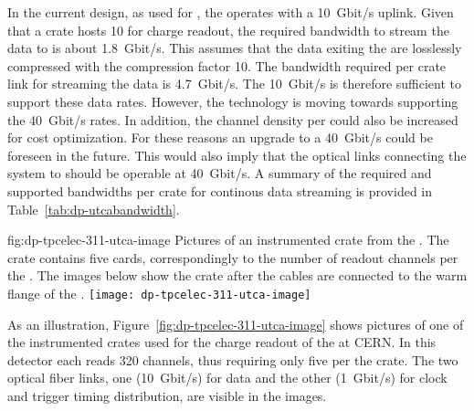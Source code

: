In the current design, as used for , the  operates with a \SI{10}{Gbit/s} uplink. Given that a  crate hosts \num{10}  for charge readout, the required bandwidth to stream the data to  is about \SI{1.8}{Gbit/s}. This assumes that the data exiting the  are losslessly compressed with the compression factor \num{10}. The bandwidth required per crate link for streaming the  data is \SI{4.7}{Gbit/s}. The \SI{10}{Gbit/s}  is therefore sufficient to support these data rates. However, the technology is moving towards supporting the \SI{40}{Gbit/s} rates. In addition, the channel density per  could also be increased for cost optimization. For these reasons an upgrade to a \SI{40}{Gbit/s}  could be foreseen in the future. This would also imply that the optical links connecting the  system to   should be operable at \SI{40}{Gbit/s}. A summary of the required and supported bandwidths per  crate for continous data streaming is provided in Table~\ref{tab:dp-utcabandwidth}.

\begin{dunefigure}{fig:dp-tpcelec-311-utca-image}
{Pictures of an instrumented  crate from the . The crate contains five  cards, correspondingly to the number of readout channels per the . The images below show the crate after the  cables are connected to the warm flange of the .}
\texttt{[image: dp-tpcelec-311-utca-image]}
\end{dunefigure}

As an illustration, Figure~\ref{fig:dp-tpcelec-311-utca-image} shows pictures of one of the instrumented  crates used for the charge readout of the  at CERN. In this detector each  reads \num{320} channels, thus requiring only five  per the  crate. The two optical fiber links, one (\SI{10}{Gbit/s}) for data and the other (\SI{1}{Gbit/s}) for clock and trigger timing distribution, are visible in the images.       

